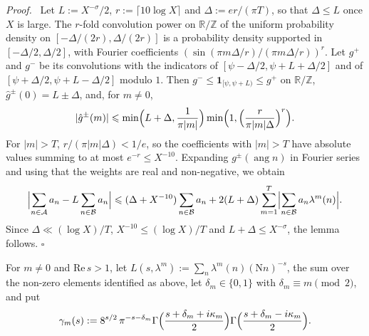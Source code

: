 \documentclass{article}
\numberwithin{equation}{section}
\newenvironment{proof}[1][Proof]{\par\medskip\noindent\textit{#1.}\ }{\hfill$\square$\par\medskip}
\newcommand{\Le}{\leqslant}
\begin{document}
\begin{proof}
Let $L := X^{-\sigma}/2$, $r := \lceil 10 \log X \rceil$ and $\Delta := er/(\pi T)$, so that $\Delta \Le L$ once $X$ is large. The $r$-fold convolution power on $\mathbb{R}/\mathbb{Z}$ of the uniform probability density on $[-\Delta/(2r), \Delta/(2r)]$ is a probability density supported in $[-\Delta/2, \Delta/2]$, with Fourier coefficients $(\sin(\pi m\Delta/r)/(\pi m\Delta/r))^r$. Let $g^{+}$ and $g^{-}$ be its convolutions with the indicators of $[\psi - \Delta/2, \psi + L + \Delta/2]$ and of $[\psi + \Delta/2, \psi + L - \Delta/2]$ modulo $1$. Then $g^- \Le \mathbf{1}_{[\psi, \psi + L)} \Le g^+$ on $\mathbb{R}/\mathbb{Z}$, $\hat g^{\pm}(0) = L \pm \Delta$, and, for $m \neq 0$,
\begin{equation*}
|\hat g^{\pm}(m)| \Le \min\Bigl( L + \Delta, \frac{1}{\pi|m|} \Bigr) \min\Bigl( 1, \Bigl( \frac{r}{\pi |m| \Delta} \Bigr)^r \Bigr).
\end{equation*}
For $|m| > T$, $r/(\pi|m|\Delta) < 1/e$, so the coefficients with $|m| > T$ have absolute values summing to at most $e^{-r} \Le X^{-10}$. Expanding $g^{\pm}(\operatorname{ang} n)$ in Fourier series and using that the weights are real and non-negative, we obtain
\begin{equation*}
\Bigl| \sum_{n \in \mathcal{A}} a_n - L \sum_{n \in \mathcal{B}} a_n \Bigr| \Le (\Delta + X^{-10}) \sum_{n \in \mathcal{B}} a_n + 2(L + \Delta) \sum_{m = 1}^{T} \Bigl| \sum_{n \in \mathcal{B}} a_n \lambda^m(n) \Bigr|.
\end{equation*}
Since $\Delta \ll (\log X)/T$, $X^{-10} \Le (\log X)/T$ and $L + \Delta \Le X^{-\sigma}$, the lemma follows.
\end{proof}

For $m \neq 0$ and $\mathrm{Re}\, s > 1$, let $L(s, \lambda^m) := \sum_{n} \lambda^m(n) (\mathrm{N}n)^{-s}$, the sum over the non-zero elements identified as above, let $\delta_m \in \{0, 1\}$ with $\delta_m \equiv m \pmod 2$, and put
\begin{equation}
\label{eq: sqrt2 gamma}
\gamma_m(s) := 8^{s/2}\, \pi^{-s - \delta_m} \Gamma\Bigl( \frac{s + \delta_m + i\kappa_m}{2} \Bigr) \Gamma\Bigl( \frac{s + \delta_m - i\kappa_m}{2} \Bigr).
\end{equation}
\end{document}
